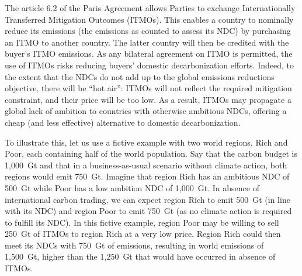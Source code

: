 \documentclass[12pt,english]{article}
\begin{document}
The article 6.2 of the Paris Agreement allows Parties to exchange Internationally Transferred Mitigation Outcomes (ITMOs). This enables a country to nominally reduce its emissions (the emissions as counted to assess its NDC) by purchasing an ITMO to another country. The latter country will then be credited with the buyer's ITMO emissions. As any bilateral agreement on ITMO is permitted, the use of ITMOs risks reducing buyers' domestic decarbonization efforts. %
Indeed, to the extent that the NDCs do not add up to the global emissions reductions objective, there will be ``hot air'': ITMOs will not reflect the required mitigation constraint, and their price will be too low. As a result, ITMOs may propagate a global lack of ambition to countries with otherwise ambitious NDCs, offering a cheap (and less effective) alternative to domestic decarbonization. 

To illustrate this, let us use a fictive example with two world regions, Rich and Poor, each containing half of the world population. Say that the carbon budget is 1,000~Gt and that in a business-as-usual scenario without climate action, both regions would emit 750~Gt. Imagine that region Rich has an ambitious NDC of 500~Gt while Poor has a low ambition NDC of 1,000~Gt. In absence of international carbon trading, we can expect region Rich to emit 500~Gt (in line with its NDC) and region Poor to emit 750~Gt (as no climate action is required to fulfill its NDC). In this fictive example, region Poor may be willing to sell 250~Gt of ITMOs to region Rich at a very low price. Region Rich could then meet its NDCs with 750~Gt of emissions, resulting in world emissions of 1,500~Gt, higher than the 1,250~Gt that would have occurred in absence of ITMOs.
\end{document}

